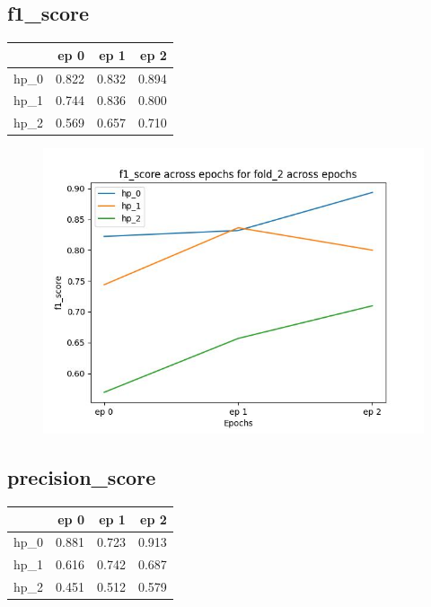 \documentclass{article}
\begin{document}
\subsection{f1\_score}
\begin{tabular}{lrrr}
\toprule
{} &   ep 0 &   ep 1 &   ep 2 \\
\midrule
hp\_0 &  0.822 &  0.832 &  0.894 \\
hp\_1 &  0.744 &  0.836 &  0.800 \\
hp\_2 &  0.569 &  0.657 &  0.710 \\
\bottomrule
\end{tabular}

\begin{figure}[H]
\includegraphics[scale = 0.75]{fold_2/f1_score}
\end{figure}
\subsection{precision\_score}
\begin{tabular}{lrrr}
\toprule
{} &   ep 0 &   ep 1 &   ep 2 \\
\midrule
hp\_0 &  0.881 &  0.723 &  0.913 \\
hp\_1 &  0.616 &  0.742 &  0.687 \\
hp\_2 &  0.451 &  0.512 &  0.579 \\
\bottomrule
\end{tabular}
\end{document}
